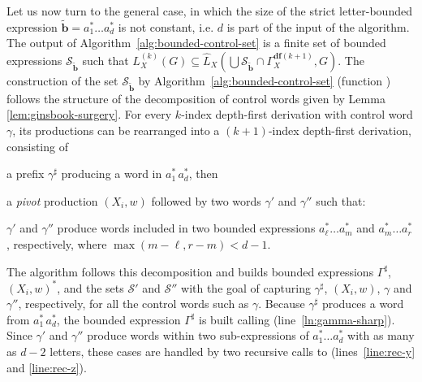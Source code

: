 \documentclass[final]{llncs}
\def\patt{{\widetilde{\mathbf{b}}}}
\def\df#1{\scriptscriptstyle\mathbf{df}(#1)}
\begin{document}
Let us now turn to the general case, in which the size of the strict
letter-bounded expression \(\patt = a_1^* \ldots a_d^*\) is not constant,
i.e. \(d\) is part of the input of the algorithm. The output of
Algorithm~\ref{alg:bounded-control-set} is a finite set of bounded
expressions $\mathcal{S}_\patt$ such that
\(L^{(k)}_X(G) \subseteq \hat{L}_X(\bigcup \mathcal{S}_\patt 
\cap\Gamma_X^{\df{k+1}}, G)\). 
The construction of the set $\mathcal{S}_\patt$ by
Algorithm~\ref{alg:bounded-control-set} (function
) follows the structure 
of the decomposition of control words given by
Lemma \ref{lem:ginsbook-surgery}. For every $k$-index depth-first derivation with 
control word $\gamma$, its productions can be rearranged into a $(k+1)$-index 
depth-first derivation, consisting of
\begin{inparaenum}
\item a prefix $\gamma^\sharp$ producing a word in \(a_1^*\, a_d^*\), then
\item a \emph{pivot} production \( (X_i,w)\) followed by two words $\gamma'$ and $\gamma''$ such that:
\item $\gamma'$ and $\gamma''$ produce words included in two
bounded expressions $a_\ell^* \ldots a_m^*$ and $a_m^* \ldots
a_r^*$, respectively, where $\max(m-\ell,r-m) < d-1$.
\end{inparaenum}
The algorithm follows this decomposition and builds bounded
expressions \(\Gamma^{\sharp}\), \( (X_i,w)^*\), and the sets
\(\mathcal{S}'\) and \(\mathcal{S}''\) with the goal of capturing
\(\gamma^{\sharp}\), \( (X_i,w)\), \(\gamma\) and \(\gamma''\), respectively,
for all the control words such as \(\gamma\).
Because \(\gamma^{\sharp}\) produces a word from \(a_1^*\, a_d^*\),
the bounded expression \(\Gamma^{\sharp}\) is built calling
 (line~\ref{ln:gamma-sharp}). Since
\(\gamma'\) and \(\gamma''\) produce words within two sub-expressions of \(a_1^*
\ldots a_d^*\) with as many as \(d-2\) letters, these cases are handled by
two recursive calls to 
(lines~\ref{line:rec-y} and \ref{line:rec-z}).
\end{document}
